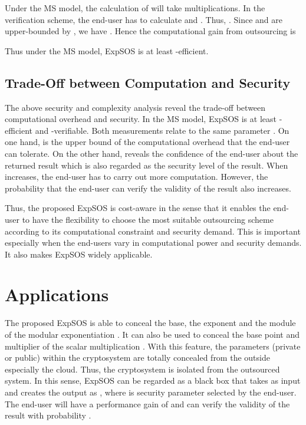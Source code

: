 \documentclass[english,draftcls,onecolumn,11pt]{IEEEtran}
\theoremstyle{definition}
\theoremstyle{plain}
\theoremstyle{plain}
\theoremstyle{definition}
\begin{document}
Under the MS model, the calculation of  will take
 multiplications. In the verification scheme, the end-user has
to calculate  and .
Thus, .
Since  and  are upper-bounded by , we have .
Hence the computational gain from outsourcing is 

 Thus under the MS model, ExpSOS is at least -efficient. 


\subsection{Trade-Off between Computation and Security}

The above security and complexity analysis reveal the trade-off between
computational overhead and security. In the MS model, ExpSOS is at
least -efficient and -verifiable.
Both measurements relate to the same parameter . On one hand,
 is the upper bound of the computational overhead that the end-user
can tolerate. On the other hand,  reveals the confidence of the
end-user about the returned result which is also regarded as the security
level of the result. When  increases, the end-user has to carry
out more computation. However, the probability that the end-user can
verify the validity of the result also increases. 

Thus, the proposed ExpSOS is cost-aware in the sense that it enables
the end-user to have the flexibility to choose the most suitable outsourcing
scheme according to its computational constraint and security demand.
This is important especially when the end-users vary in computational
power and security demands. It also makes ExpSOS widely applicable.


\section{Applications\label{sec:Application}}

The proposed ExpSOS is able to conceal the base, the exponent and
the module of the modular exponentiation . It can also
be used to conceal the base point  and multiplier  of the
scalar multiplication . With this feature, the parameters (private
or public) within the cryptosystem are totally concealed from the
outside especially the cloud. Thus, the cryptosystem is isolated from
the outsourced system. In this sense, ExpSOS can be regarded as a
black box that takes as input  and creates the output
 as ,
where  is security parameter selected by the end-user. The end-user
will have a performance gain of  and can verify
the validity of the result with probability . 
\end{document}
